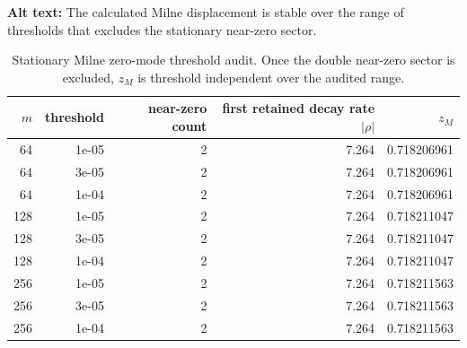 \begin{table}[ht]
\centering
\caption{Stationary Milne zero-mode threshold audit.  Once the double near-zero sector is excluded, $z_M$ is threshold independent over the audited range.}
\par\raggedright\textbf{Alt text:} The calculated Milne displacement is stable over the range of thresholds that excludes the stationary near-zero sector.\par\centering

\label{tab:milne_threshold}
\begin{tabular}{rrrrr}
\toprule
$m$ & threshold & near-zero count & first retained decay rate $|\rho|$ & $z_M$\\
\midrule
64 & 1e-05 & 2 & 7.264 & 0.718206961\\
64 & 3e-05 & 2 & 7.264 & 0.718206961\\
64 & 1e-04 & 2 & 7.264 & 0.718206961\\
128 & 1e-05 & 2 & 7.264 & 0.718211047\\
128 & 3e-05 & 2 & 7.264 & 0.718211047\\
128 & 1e-04 & 2 & 7.264 & 0.718211047\\
256 & 1e-05 & 2 & 7.264 & 0.718211563\\
256 & 3e-05 & 2 & 7.264 & 0.718211563\\
256 & 1e-04 & 2 & 7.264 & 0.718211563\\
\bottomrule
\end{tabular}
\end{table}
